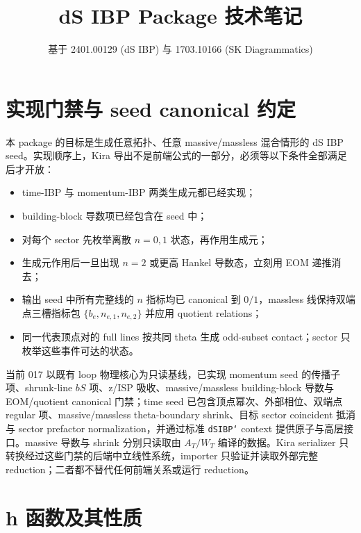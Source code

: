 ﻿\documentclass[a4paper,11pt]{article}
\title{dS IBP Package 技术笔记}
\author{基于 2401.00129 (dS IBP) 与 1703.10166 (SK Diagrammatics)}
\begin{document}
\sloppy
\maketitle
\tableofcontents
\newpage

\section{实现门禁与 seed canonical 约定}

本 package 的目标是生成任意拓扑、任意 massive/massless 混合情形的 dS IBP seed。实现顺序上，Kira 导出不是前端公式的一部分，必须等以下条件全部满足后才开放：
\begin{itemize}
  \item time-IBP 与 momentum-IBP 两类生成元都已经实现；
  \item building-block 导数项已经包含在 seed 中；
  \item 对每个 sector 先枚举离散 $n=0,1$ 状态，再作用生成元；
  \item 生成元作用后一旦出现 $n=2$ 或更高 Hankel 导数态，立刻用 EOM 递推消去；
  \item 输出 seed 中所有完整线的 $n$ 指标均已 canonical 到 $0/1$，massless 线保持双端点三槽指标包 $\{b_e,n_{e,1},n_{e,2}\}$ 并应用 quotient relations；
  \item 同一代表顶点对的 full lines 按共同 theta 生成 odd-subset contact；sector 只枚举这些事件可达的状态。
\end{itemize}

当前 017 以既有 loop 物理核心为只读基线，已实现 momentum seed 的传播子项、shrunk-line $bS$ 项、z/ISP 吸收、massive/massless building-block 导数与 EOM/quotient canonical 门禁；time seed 已包含顶点幂次、外部相位、双端点 regular 项、massive/massless theta-boundary shrink、目标 sector coincident 抵消与 sector prefactor normalization，并通过标准 \texttt{dSIBP`} context 提供原子与高层接口。massive 导数与 shrink 分别只读取由 $A_T/W_T$ 编译的数据。Kira serializer 只转换经过这些门禁的后端中立线性系统，importer 只验证并读取外部完整 reduction；二者都不替代任何前端关系或运行 reduction。

\section{h 函数及其性质}
\end{document}
